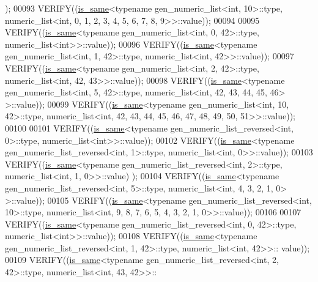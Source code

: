 \begin{DoxyCode}
      );
00093   VERIFY((\hyperlink{struct_eigen_1_1internal_1_1is__same}{is\_same}<\textcolor{keyword}{typename} gen\_numeric\_list<int, 10>::type, numeric\_list<int, 0, 1, 2, 3, 4, 5, 6,
       7, 8, 9>>::value));
00094 
00095   VERIFY((\hyperlink{struct_eigen_1_1internal_1_1is__same}{is\_same}<\textcolor{keyword}{typename} gen\_numeric\_list<int, 0, 42>::type, numeric\_list<int>>::value));
00096   VERIFY((\hyperlink{struct_eigen_1_1internal_1_1is__same}{is\_same}<\textcolor{keyword}{typename} gen\_numeric\_list<int, 1, 42>::type, numeric\_list<int, 42>>::value));
00097   VERIFY((\hyperlink{struct_eigen_1_1internal_1_1is__same}{is\_same}<\textcolor{keyword}{typename} gen\_numeric\_list<int, 2, 42>::type, numeric\_list<int, 42, 43>>::value));
00098   VERIFY((\hyperlink{struct_eigen_1_1internal_1_1is__same}{is\_same}<\textcolor{keyword}{typename} gen\_numeric\_list<int, 5, 42>::type, numeric\_list<int, 42, 43, 44, 45, 46>
      >::value));
00099   VERIFY((\hyperlink{struct_eigen_1_1internal_1_1is__same}{is\_same}<\textcolor{keyword}{typename} gen\_numeric\_list<int, 10, 42>::type, numeric\_list<int, 42, 43, 44, 45,
       46, 47, 48, 49, 50, 51>>::value));
00100 
00101   VERIFY((\hyperlink{struct_eigen_1_1internal_1_1is__same}{is\_same}<\textcolor{keyword}{typename} gen\_numeric\_list\_reversed<int, 0>::type, numeric\_list<int>>::value));
00102   VERIFY((\hyperlink{struct_eigen_1_1internal_1_1is__same}{is\_same}<\textcolor{keyword}{typename} gen\_numeric\_list\_reversed<int, 1>::type, numeric\_list<int, 0>>::value));
00103   VERIFY((\hyperlink{struct_eigen_1_1internal_1_1is__same}{is\_same}<\textcolor{keyword}{typename} gen\_numeric\_list\_reversed<int, 2>::type, numeric\_list<int, 1, 0>>::value)
      );
00104   VERIFY((\hyperlink{struct_eigen_1_1internal_1_1is__same}{is\_same}<\textcolor{keyword}{typename} gen\_numeric\_list\_reversed<int, 5>::type, numeric\_list<int, 4, 3, 2, 1, 0>
      >::value));
00105   VERIFY((\hyperlink{struct_eigen_1_1internal_1_1is__same}{is\_same}<\textcolor{keyword}{typename} gen\_numeric\_list\_reversed<int, 10>::type, numeric\_list<int, 9, 8, 7, 6,
       5, 4, 3, 2, 1, 0>>::value));
00106 
00107   VERIFY((\hyperlink{struct_eigen_1_1internal_1_1is__same}{is\_same}<\textcolor{keyword}{typename} gen\_numeric\_list\_reversed<int, 0, 42>::type, numeric\_list<int>>::value));
00108   VERIFY((\hyperlink{struct_eigen_1_1internal_1_1is__same}{is\_same}<\textcolor{keyword}{typename} gen\_numeric\_list\_reversed<int, 1, 42>::type, numeric\_list<int, 42>>::
      value));
00109   VERIFY((\hyperlink{struct_eigen_1_1internal_1_1is__same}{is\_same}<\textcolor{keyword}{typename} gen\_numeric\_list\_reversed<int, 2, 42>::type, numeric\_list<int, 43, 42>>::

\end{DoxyCode}
